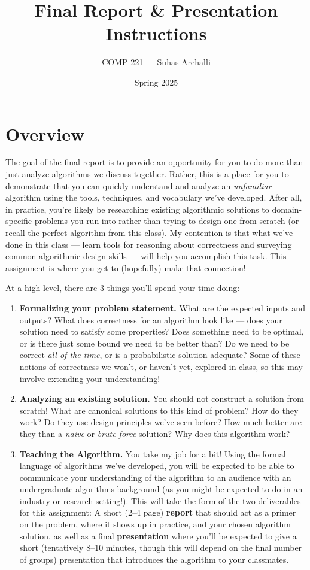 \documentclass{article}
\title{Final Report \& Presentation Instructions}
\author{COMP 221 --- Suhas Arehalli}
\date{Spring 2025}
\begin{document}
\maketitle

\section*{Overview}
The goal of the final report is to provide an opportunity for you to do more than just analyze algorithms we discuss together. Rather, this is a place for you to demonstrate that you can quickly understand and analyze an \textit{unfamiliar} algorithm using the tools, techniques, and vocabulary we've developed. After all, in practice, you're likely be researching existing algorithmic solutions to domain-specific problems you run into  rather than trying to design one from scratch (or recall the perfect algorithm from this class). My contention is that what we've done in this class --- learn tools for reasoning about correctness and surveying common algorithmic design skills --- will help you accomplish this task. This assignment is where you get to (hopefully) make that connection!

At a high level, there are 3 things you'll spend your time doing:
\begin{enumerate}
    \item \textbf{Formalizing your problem statement.} What are the expected inputs and outputs? What does correctness for an algorithm look like --- does your solution need to satisfy some properties? Does something need to be optimal, or is there just some bound we need to be better than? Do we need to be correct \textit{all of the time}, or is a probabilistic solution adequate? Some of these notions of correctness we won't, or haven't yet, explored in class, so this may involve extending your understanding!

    \item \textbf{Analyzing an existing solution.} You should not construct a solution from scratch! What are canonical solutions to this kind of problem? How do they work? Do they use design principles we've seen before? How much better are they than a \textit{naive} or \textit{brute force} solution? Why does this algorithm work?

    \item \textbf{Teaching the Algorithm.} You take my job for a bit! Using the formal language of algorithms we've developed, you will be expected to be able to communicate your understanding of the algorithm to an audience with an undergraduate algorithms background (as you might be expected to do in an industry or research setting!). This will take the form of the two deliverables for this assignment: A short (2--4 page) \textbf{report} that should act as a primer on the problem, where it shows up in practice, and your chosen algorithm solution, as well as a final \textbf{presentation} where you'll be expected to give a short (tentatively 8--10 minutes, though this will depend on the final number of groups) presentation that introduces the algorithm to your classmates. 
\end{enumerate}
\end{document}
